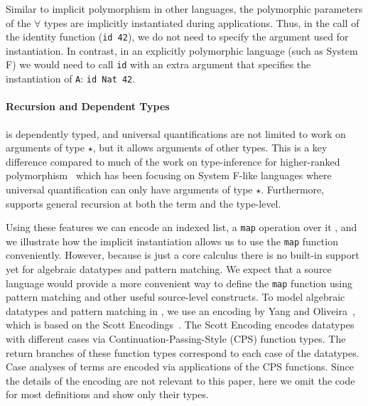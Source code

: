Similar to implicit polymorphism in other languages,
the polymorphic parameters of the $\forall$ types are implicitly instantiated
during applications. Thus, in the call of the identity function (\lstinline{id 42}), we
do not need to specify the argument used for instantiation. In contrast,
in an explicitly polymorphic language (such as System F) we would need
to call \lstinline{id} with an extra argument that specifies the instantiation of \lstinline{A}:
\lstinline{id Nat 42}.

\paragraph{Recursion and Dependent Types}

\name is dependently typed, and universal quantifications are not limited to work
on arguments of type $\star$, but it allows arguments of other types. This is
a key difference compared to much of the work on type-inference for higher-ranked
polymorphism~\citep{dunfield2013complete,le2003ml,leijen2008hmf,vytiniotis2008fph,jones2007practical}
which has been focusing on System F-like
languages where universal quantification can only have arguments of type $\star$.
Furthermore, \name supports general recursion at both the term and the type-level.

Using these features we can encode an indexed list, a \lstinline{map} operation over it
, and we illustrate how the implicit instantiation allows us to use the \lstinline{map}
function conveniently.
However, because \name is just a core calculus there is no built-in support
yet for algebraic datatypes and pattern matching.
We expect that a source language would provide a more convenient
way to define the \lstinline{map} function using pattern matching and other useful source-level
constructs. To model algebraic datatypes and pattern matching in \name, we
use an encoding by Yang and Oliveira~\citep{yang2019pure},
which is based on the Scott Encodings~\citep{mogensen1992efficient}.
The Scott Encoding encodes datatypes with different cases via
Continuation-Passing-Style (CPS) function types. The return branches of these
function types correspond to each case of the datatypes.
Case analyses of terms are encoded via applications of the CPS functions.
Since the details of the encoding are not relevant to this paper,
here we omit the code for most definitions and show only their types.

